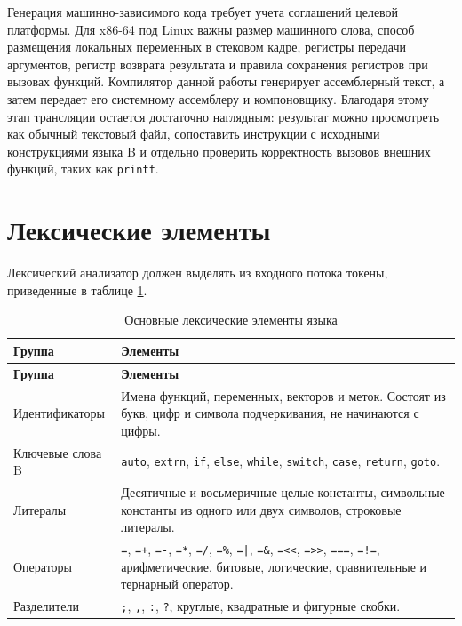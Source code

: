 Генерация машинно-зависимого кода требует учета соглашений целевой платформы. Для x86-64 под Linux важны размер машинного слова, способ размещения локальных переменных в стековом кадре, регистры передачи аргументов, регистр возврата результата и правила сохранения регистров при вызовах функций. Компилятор данной работы генерирует ассемблерный текст, а затем передает его системному ассемблеру и компоновщику. Благодаря этому этап трансляции остается достаточно наглядным: результат можно просмотреть как обычный текстовый файл, сопоставить инструкции с исходными конструкциями языка B и отдельно проверить корректность вызовов внешних функций, таких как \texttt{printf}.

\section{Лексические элементы}

Лексический анализатор должен выделять из входного потока токены, приведенные в таблице \ref{tbl:tokens}.

\begin{longtable}{|p{4.2cm}|p{11.8cm}|}
  \caption{Основные лексические элементы языка}
  \label{tbl:tokens} \\
  \hline
  \textbf{Группа} & \textbf{Элементы} \\
  \hline
  \endfirsthead
  \hline
  \textbf{Группа} & \textbf{Элементы} \\
  \hline
  \endhead
  Идентификаторы & Имена функций, переменных, векторов и меток. Состоят из букв, цифр и символа подчеркивания, не начинаются с цифры. \\
  \hline
  Ключевые слова B & \texttt{auto}, \texttt{extrn}, \texttt{if}, \texttt{else}, \texttt{while}, \texttt{switch}, \texttt{case}, \texttt{return}, \texttt{goto}. \\
  \hline
  Литералы & Десятичные и восьмеричные целые константы, символьные константы из одного или двух символов, строковые литералы. \\
  \hline
  Операторы & \texttt{=}, \texttt{=+}, \texttt{=-}, \texttt{=*}, \texttt{=/}, \texttt{=\%}, \texttt{=|}, \texttt{=\&}, \texttt{=<<}, \texttt{=>>}, \texttt{===}, \texttt{=!=}, арифметические, битовые, логические, сравнительные и тернарный оператор. \\
  \hline
  Разделители & \texttt{;}, \texttt{,}, \texttt{:}, \texttt{?}, круглые, квадратные и фигурные скобки. \\
  \hline
\end{longtable}

